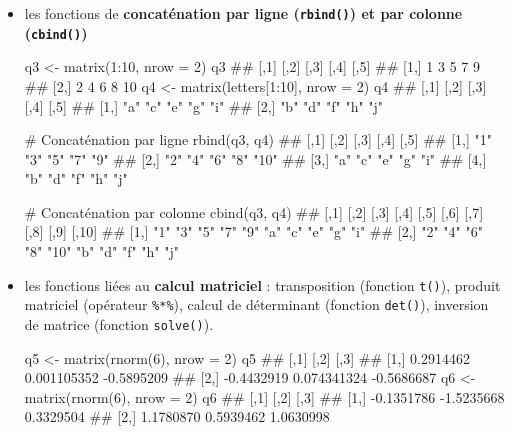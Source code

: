 \documentclass[12pt,twosided, notitlepage]{book}
\newenvironment{Shaded}{}{}
\newcommand{\KeywordTok}[1]{\textcolor[rgb]{0.00,0.00,1.00}{{#1}}}
\newcommand{\DataTypeTok}[1]{{#1}}
\newcommand{\DecValTok}[1]{{#1}}
\newcommand{\StringTok}[1]{\textcolor[rgb]{0.00,0.50,0.50}{{#1}}}
\newcommand{\CommentTok}[1]{\textcolor[rgb]{0.00,0.50,0.00}{{#1}}}
\newcommand{\NormalTok}[1]{{#1}}
\renewenvironment{Shaded}{\begin{snugshade}}{\end{snugshade}}
\begin{document}
\begin{itemize}
\item
  les fonctions de \textbf{concaténation par ligne (\texttt{rbind()}) et
  par colonne
  (\texttt{cbind()})}

\begin{Shaded}
\begin{Highlighting}[]
\NormalTok{q3 <-}\StringTok{ }\KeywordTok{matrix}\NormalTok{(}\DecValTok{1}\NormalTok{:}\DecValTok{10}\NormalTok{, }\DataTypeTok{nrow =} \DecValTok{2}\NormalTok{)}
\NormalTok{q3}
  \NormalTok{##      [,1] [,2] [,3] [,4] [,5]}
  \NormalTok{## [1,]    1    3    5    7    9}
  \NormalTok{## [2,]    2    4    6    8   10}
\NormalTok{q4 <-}\StringTok{ }\KeywordTok{matrix}\NormalTok{(letters[}\DecValTok{1}\NormalTok{:}\DecValTok{10}\NormalTok{], }\DataTypeTok{nrow =} \DecValTok{2}\NormalTok{)}
\NormalTok{q4}
  \NormalTok{##      [,1] [,2] [,3] [,4] [,5]}
  \NormalTok{## [1,] "a"  "c"  "e"  "g"  "i" }
  \NormalTok{## [2,] "b"  "d"  "f"  "h"  "j"}

\CommentTok{# Concaténation par ligne}
\KeywordTok{rbind}\NormalTok{(q3, q4)}
  \NormalTok{##      [,1] [,2] [,3] [,4] [,5]}
  \NormalTok{## [1,] "1"  "3"  "5"  "7"  "9" }
  \NormalTok{## [2,] "2"  "4"  "6"  "8"  "10"}
  \NormalTok{## [3,] "a"  "c"  "e"  "g"  "i" }
  \NormalTok{## [4,] "b"  "d"  "f"  "h"  "j"}

\CommentTok{# Concaténation par colonne}
\KeywordTok{cbind}\NormalTok{(q3, q4)}
  \NormalTok{##      [,1] [,2] [,3] [,4] [,5] [,6] [,7] [,8] [,9] [,10]}
  \NormalTok{## [1,] "1"  "3"  "5"  "7"  "9"  "a"  "c"  "e"  "g"  "i"  }
  \NormalTok{## [2,] "2"  "4"  "6"  "8"  "10" "b"  "d"  "f"  "h"  "j"}
\end{Highlighting}
\end{Shaded}
\item
  les fonctions liées au \textbf{calcul matriciel} : transposition
  (fonction \texttt{t()}), produit matriciel
  (opérateur \texttt{\%*\%}), calcul de
  déterminant (fonction \texttt{det()}),
  inversion de matrice (fonction
  \texttt{solve()}).

\begin{Shaded}
\begin{Highlighting}[]
\NormalTok{q5 <-}\StringTok{ }\KeywordTok{matrix}\NormalTok{(}\KeywordTok{rnorm}\NormalTok{(}\DecValTok{6}\NormalTok{), }\DataTypeTok{nrow =} \DecValTok{2}\NormalTok{)}
\NormalTok{q5}
  \NormalTok{##            [,1]        [,2]       [,3]}
  \NormalTok{## [1,]  0.2914462 0.001105352 -0.5895209}
  \NormalTok{## [2,] -0.4432919 0.074341324 -0.5686687}
\NormalTok{q6 <-}\StringTok{ }\KeywordTok{matrix}\NormalTok{(}\KeywordTok{rnorm}\NormalTok{(}\DecValTok{6}\NormalTok{), }\DataTypeTok{nrow =} \DecValTok{2}\NormalTok{)}
\NormalTok{q6}
  \NormalTok{##            [,1]       [,2]      [,3]}
  \NormalTok{## [1,] -0.1351786 -1.5235668 0.3329504}
  \NormalTok{## [2,]  1.1780870  0.5939462 1.0630998}


\end{Highlighting}
\end{Shaded}
\end{itemize}
\end{document}

